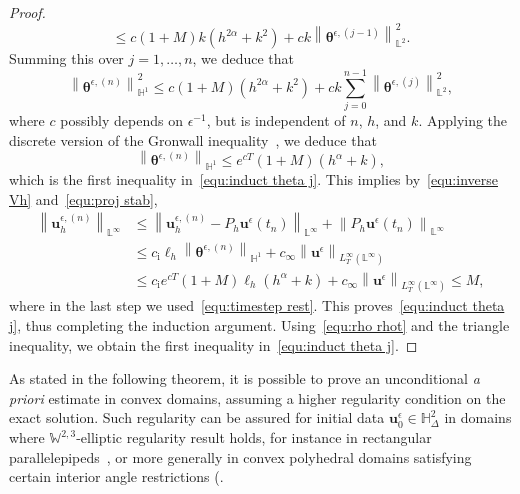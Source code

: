 \documentclass[11pt,reqno]{amsart}
\theoremstyle{definition}
\numberwithin{equation}{section}
\newcommand{\bff}{\boldsymbol}
\newcommand{\bb}{\mathbb}
\newcommand{\norm}[2]{\left\|{#1}\right\|_{#2}}
\begin{document}
\begin{proof}
\[	\le
	c(1+M)k(h^{2\alpha}+k^2) 
	+ 
	ck \norm{\bff{\theta}^{\epsilon, (j-1)}}{\bb{L}^2}^2.
\]
Summing this over $j=1,\ldots, n$, we deduce that
\[
	\norm{\bff{\theta}^{\epsilon, (n)}}{\bb{H}^1}^2
	\le
	c(1+M)(h^{2\alpha}+k^2) + ck \sum_{j=0}^{n-1} \norm{\bff{\theta}^{\epsilon, (j)}}{\bb{L}^2}^2,
\]
where $c$ possibly depends on $\epsilon^{-1}$, but is independent of $n$, $h$, and $k$.
Applying the discrete version of the Gronwall inequality~\citep[Lemma~1]{Sug69}, we
deduce that
\begin{equation*}
	\norm{\bff{\theta}^{\epsilon, (n)}}{\bb{H}^1} \leq e^{cT}(1+M)(h^{\alpha}+k),
\end{equation*}
which is the first inequality in~\eqref{equ:induct theta j}. This implies by~\eqref{equ:inverse Vh} and~\eqref{equ:proj stab},
\begin{align*}
	\norm{\bff{u}_h^{\epsilon, (n)}}{\bb{L}^\infty}
	&\leq
	\norm{\bff{u}_h^{\epsilon, (n)}- P_h\bff{u}^\epsilon(t_n)}{\bb{L}^\infty}
	+
	\norm{P_h \bff{u}^\epsilon(t_n)}{\bb{L}^\infty}
	\\
	&\leq
	c_{\mathrm{i}} \ell_h \norm{\bff{\theta}^{\epsilon, (n)}}{\bb{H}^1} + c_\infty \norm{\bff{u}^\epsilon}{L^\infty_T(\bb{L}^\infty)}
	\\
	&\leq
	c_{\mathrm{i}} e^{cT}(1+M) \ell_h (h^\alpha+k)+ c_\infty \norm{\bff{u}^\epsilon}{L^\infty_T(\bb{L}^\infty)}
	\leq
	M,
\end{align*}
where in the last step we used~\eqref{equ:timestep rest}. This proves~\eqref{equ:induct theta j}, thus completing the induction argument.
Using~\eqref{equ:rho rhot}
and the triangle inequality, we obtain the first inequality in~\eqref{equ:induct theta j}. 
\end{proof}

As stated in the following theorem, it is possible to prove an unconditional \emph{a priori} estimate in convex domains, assuming a higher regularity condition on the exact solution. Such regularity can be assured for initial data $\bff{u}_0^\epsilon\in \bb{H}^2_\Delta$ in domains where $\bb{W}^{2,3}$-elliptic regularity result holds, for instance in rectangular parallelepipeds~\citep{Dau92}, or more generally in convex polyhedral domains satisfying certain interior angle restrictions (\citep[Chapter~4]{Gri11}.
\end{document}
